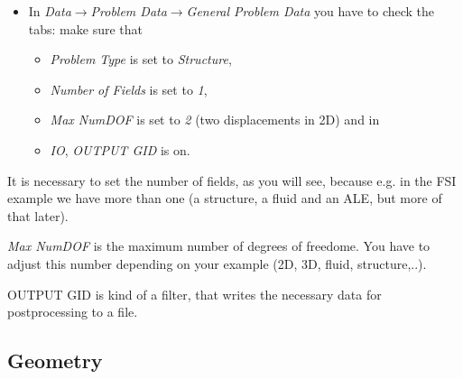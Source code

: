 \begin{itemize}
\item In \emph{Data$\to$Problem Data$\to$General Problem Data} you have
to check the tabs: make sure that 

\begin{itemize}
\item \emph{Problem Type} is set to \emph{Structure}, 
\item \emph{Number of Fields} is set to \emph{1}, 
\item \emph{Max NumDOF} is set to \emph{2} (two displacements in 2D) and
in 
\item \emph{IO}, \emph{OUTPUT GID} is on.
\end{itemize}
\end{itemize}
It is necessary to set the number of fields, as you will see, because
e.g. in the FSI example we have more than one (a structure, a fluid
and an ALE, but more of that later).

\emph{Max NumDOF} is the maximum number of degrees of freedome. You have to adjust
this number depending on your example (2D, 3D, fluid, structure,..).

OUTPUT GID is kind of a filter, that writes the necessary data for
postprocessing to a file.


\subsection{Geometry}

